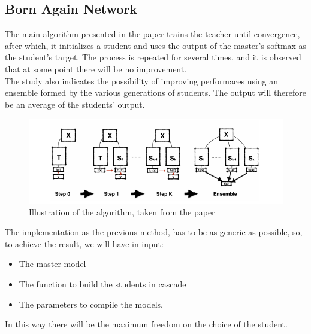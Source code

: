 \subsection{Born Again Network}

The main algorithm presented in the paper\cite{ban} trains the teacher until convergence, after which, it initializes a student and uses the output of the master's softmax as the student's target. The process is repeated for several times, and it is observed that at some point there will be no improvement.\\
The study also indicates the possibility of improving performaces using an ensemble formed by the various generations of students. The output will therefore be an average of the students' output.

\begin{figure}[h!]
\centering
\includegraphics[width=1\textwidth]{ban.png}
\caption{Illustration of the algorithm, taken from the paper \cite{ban}}
\end{figure}
The implementation as the previous method, has to be as generic as possible, so, to achieve the result, we will have in input:
\begin{itemize}
\item The master model
\item The function to build the students in cascade
\item The parameters to compile the models.
\end{itemize}
In this way there will be the maximum freedom on the choice of the student.
\newpage
\lstset{language=Python}
\lstset{frame=lines}
\lstset{basicstyle=\footnotesize}
